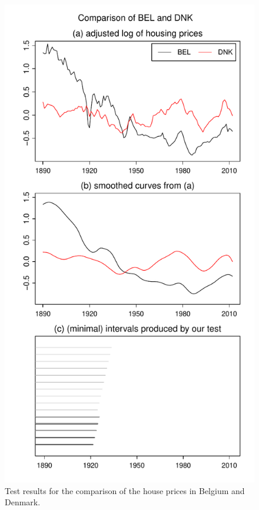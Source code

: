 \documentclass[12pt]{article}
\begin{document}
\begin{figure}
\hspace{0.1cm}
\begin{minipage}[t]{0.24\textwidth}
\includegraphics[width=\textwidth]{../output/plots/hp/BEL_vs_DNK}
\caption{Test results for the comparison of the house prices in Belgium and Denmark.}\label{fig:hp:Belgium:Denmark}
\end{minipage}

\end{figure}
\end{document}
